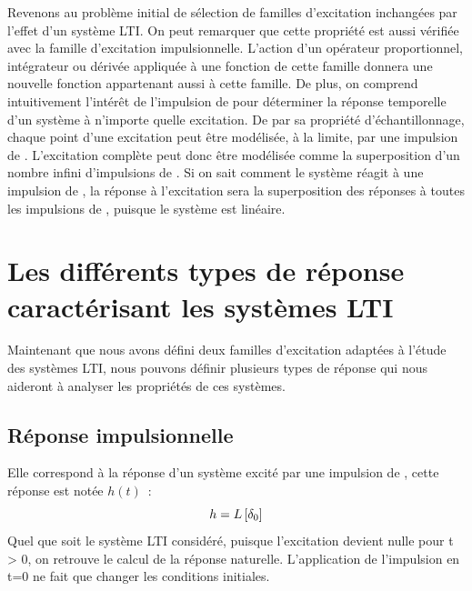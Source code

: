 \begin{remark}{}
        Revenons au problème initial de sélection de familles
        d'excitation inchangées par l'effet d'un système LTI. On peut
        remarquer que cette propriété est aussi vérifiée avec la
        famille d'excitation impulsionnelle. L'action d'un opérateur
        proportionnel, intégrateur ou dérivée appliquée à une fonction
        de cette famille donnera une nouvelle fonction appartenant
        aussi à cette famille. De plus, on comprend intuitivement
        l'intérêt de l'impulsion de \Dirac{} pour déterminer la
        réponse temporelle d'un système à n'importe quelle
        excitation. De par sa propriété d'échantillonnage, chaque
        point d'une excitation peut être modélisée, à la limite, par
        une impulsion de \Dirac. L'excitation complète peut donc être
        modélisée comme la superposition d'un nombre infini
        d'impulsions de \Dirac. Si on sait comment le système réagit à
        une impulsion de \Dirac, la réponse à l'excitation sera la
        superposition des réponses à toutes les impulsions de \Dirac,
        puisque le système est linéaire.
	
	
	
	\section{Les différents types de réponse caractérisant les systèmes LTI}
	Maintenant que nous avons défini deux familles d'excitation
        adaptées à l'étude des systèmes LTI, nous pouvons définir
        plusieurs types de réponse qui nous aideront à analyser les
        propriétés de ces systèmes.
		
	
	\subsection{Réponse impulsionnelle}
	Elle correspond à la réponse d'un système excité par une
        impulsion de \Dirac, cette réponse est notée $h(t)$~:
	\begin{equation}
          h = L\left[\delta_0\right]
        \end{equation}
	Quel que soit le système LTI considéré, puisque l'excitation
        devient nulle pour t > 0, on retrouve le calcul de la réponse
        naturelle. L'application de l'impulsion en t=0 ne fait que
        changer les conditions initiales.
	

\end{remark}
